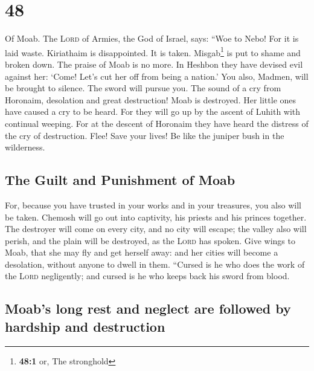 \hypertarget{section-47}{%
\section{48}\label{section-47}}

 Of Moab. The \textsc{Lord} of Armies, the God of Israel,
says: ``Woe to Nebo! For it is laid waste. Kiriathaim is disappointed.
It is taken. Misgab\footnote{\textbf{48:1} or, The stronghold} is put to
shame and broken down.  The praise of Moab is no more. In
Heshbon they have devised evil against her: `Come! Let's cut her off
from being a nation.' You also, Madmen, will be brought to silence. The
sword will pursue you.  The sound of a cry from Horonaim,
desolation and great destruction!  Moab is destroyed. Her
little ones have caused a cry to be heard.  For they will
go up by the ascent of Luhith with continual weeping. For at the descent
of Horonaim they have heard the distress of the cry of destruction.
 Flee! Save your lives! Be like the juniper bush in the
wilderness.

\hypertarget{the-guilt-and-punishment-of-moab}{%
\subsection{The Guilt and Punishment of
Moab}\label{the-guilt-and-punishment-of-moab}}

 For, because you have trusted in your works and in your
treasures, you also will be taken. Chemosh will go out into captivity,
his priests and his princes together.  The destroyer will
come on every city, and no city will escape; the valley also will
perish, and the plain will be destroyed, as the \textsc{Lord} has
spoken.  Give wings to Moab, that she may fly and get
herself away: and her cities will become a desolation, without anyone to
dwell in them.  ``Cursed is he who does the work of the
\textsc{Lord} negligently; and cursed is he who keeps back his sword
from blood.

\hypertarget{moabs-long-rest-and-neglect-are-followed-by-hardship-and-destruction}{%
\subsection{Moab's long rest and neglect are followed by hardship and
destruction}\label{moabs-long-rest-and-neglect-are-followed-by-hardship-and-destruction}}

